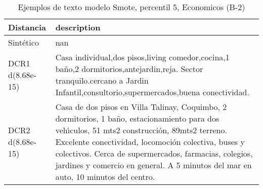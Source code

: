 \begin{table}[H]
\centering
\fontsize{10}{14}\selectfont
\caption{Ejemplos de texto modelo Smote, percentil 5, Economicos (B-2)}
\label{table-example-economicos-b-2-smote-enc-5p-text}
\begin{tabular}{|l|m{35em}|}
\hline
\rowcolor[gray]{0.8}
Distancia & description \\
\hline Sintético & nan \\
\hline DCR1 d(8.68e-15) & Casa individual,dos pisos,living comedor,cocina,1 ba\~no,2 dormitorios,antejardin,reja.    Sector tranquilo.cercano a Jardin Infantil,consultorio,supermercados,buena conectividad. \\
\hline DCR2 d(8.68e-15) & Casa de dos pisos en Villa Talinay, Coquimbo, 2 dormitorios, 1 ba\~no, estacionamiento para dos veh{\'\i}culos, 51 mts2 construcci\'on, 89mts2 terreno. Excelente conectividad, locomoci\'on colectiva, buses y colectivos. Cerca de supermercados, farmacias, colegios, jardines y comercio en general. A 5 minutos del mar en auto, 10 minutos del centro. \\
\hline
\end{tabular}
\end{table}
